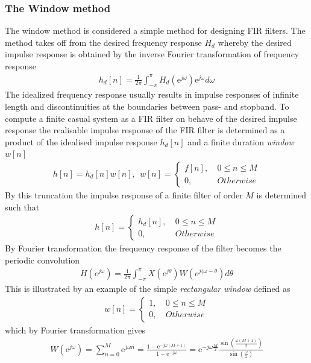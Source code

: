 \subsubsection{The Window method}
The window method is considered a simple method for designing FIR filters. The method takes off from the desired frequency response $H_d$ whereby the desired impulse response is obtained by the inverse Fourier transformation of frequency response
\begin{align}
h_d[n]=\frac{1}{2\pi}\int_{-\pi}^{\pi} H_d(\text{e}^{j\omega})\text{e}^{j\omega} d\omega
\end{align}
The idealized frequency response usually results in impulse responses of infinite length and discontinuities at the boundaries between pass- and stopband. To compute a finite casual system as a FIR filter on behave of the desired impulse response the realisable impulse response of the FIR filter is determined as a product of the idealised impulse response $h_d[n]$ and a finite duration \textit{window} $w[n]$ 
\begin{align}
h[n]=h_d[n]w[n], \ \ w[n] =
\left\{ \begin{matrix}
f[n], &\ 0 \leq n \leq M \\
0, &\ Otherwise
\end{matrix}\right.
\end{align}       
By this truncation the impulse response of a finite filter of order $M$ is determined such that
\begin{align}
h[n]= 
\left\{ \begin{matrix}
h_d[n], &\ 0 \leq n \leq M \\
0, &\ Otherwise
\end{matrix}\right.
\end{align}
By Fourier transformation the frequency response of the filter becomes the periodic convolution 
\begin{align}
H(e^{j\omega})=\frac{1}{2\pi}\int_{-\pi}^{\pi} X(e^{j\theta})W(e^{j(\omega-\theta})d\theta
\end{align} 
This is illustrated by an example of the simple \textit{rectangular window} defined as 
\begin{align}
w[n] =
\left\{ \begin{matrix}
1, &\ 0 \leq n \leq M \\
0, &\ Otherwise
\end{matrix}\right.
\end{align}
which by Fourier transformation gives 
\begin{align}
W \left(\text{e}^{j\omega}\right)=\sum_{n=0}^{M} \text{e}^{j\omega n} = \frac{1- \text{e}^{-j\omega(M+1)}}{1- \text{e}^{-j\omega}} = \text{e}^{-j\omega \frac{M}{2}} \frac{ \sin \left( \frac{\omega \left( M+1 \right)}{2} \right)}{\sin \left( \frac{\omega}{2} \right)} 
\end{align}

